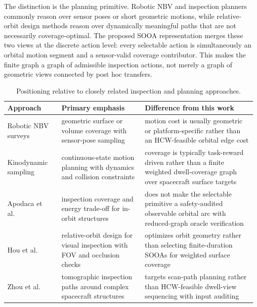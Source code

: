 The distinction is the planning primitive. Robotic NBV and inspection planners
commonly reason over sensor poses or short geometric motions, while
relative-orbit design methods reason over dynamically meaningful paths that
are not necessarily coverage-optimal. The proposed SOOA representation merges
these two views at the discrete action level: every selectable action is
simultaneously an orbital motion segment and a sensor-valid coverage
contributor. This makes the finite graph a graph of admissible inspection
actions, not merely a graph of geometric views connected by post hoc
transfers.

\begin{table}[t]
  \centering
  \caption{Positioning relative to closely related inspection and planning
  approaches.}
  \label{tab:positioning}
  \renewcommand{\arraystretch}{1.08}
  \setlength{\tabcolsep}{4.0pt}
  \begin{tabularx}{\textwidth}{@{}>{\RaggedRight\arraybackslash}p{}>{\RaggedRight\arraybackslash}p{}>{\RaggedRight\arraybackslash}X@{}}
    \toprule
    Approach & Primary emphasis & Difference from this work \\
    \midrule
    Robotic NBV surveys~\cite{scott2003view} &
    geometric surface or volume coverage with sensor-pose sampling &
    motion cost is usually geometric or platform-specific rather than an
    HCW-feasible orbital edge cost \\
    Kinodynamic sampling~\cite{lavalle1998rapidly,karaman2011sampling} &
    continuous-state motion planning with dynamics and collision constraints &
    coverage is typically task-reward driven rather than a finite weighted
    dwell-coverage graph over spacecraft surface targets \\
    Apodaca et al.~\cite{apodaca2025trajectory} &
    inspection coverage and energy trade-off for in-orbit structures &
    does not make the selectable primitive a safety-audited observable orbital
    arc with reduced-graph oracle verification \\
    Hou et al.~\cite{hou2024relative} &
    relative-orbit design for visual inspection with FOV and occlusion checks &
    optimizes orbit geometry rather than selecting finite-duration SOOAs for
    weighted surface coverage \\
    Zhou et al.~\cite{zhou2026tomographic} &
    tomographic inspection paths around complex spacecraft structures &
    targets scan-path planning rather than HCW-feasible dwell-view sequencing
    with input auditing \\

\end{tabularx}
\end{table}
